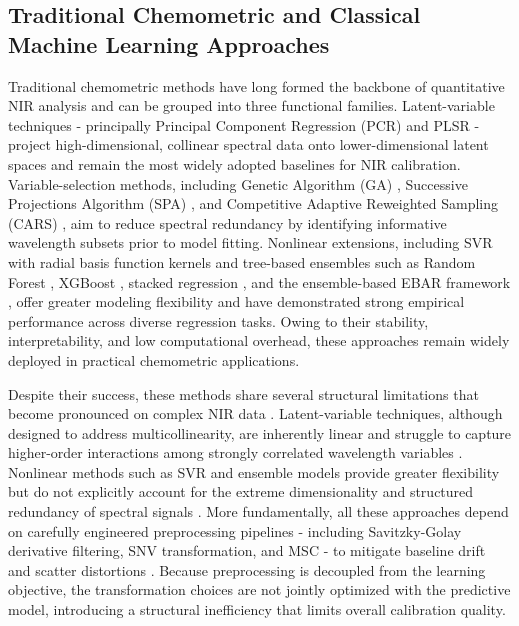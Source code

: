 \documentclass[pdflatex,sn-mathphys-num]{sn-jnl}%
\begin{document}
\subsection{Traditional Chemometric and Classical Machine 
Learning Approaches}

Traditional chemometric methods have long formed the backbone of quantitative NIR analysis and can be grouped into three functional families. Latent-variable techniques - principally Principal Component Regression (PCR) \cite{barati2025principal, wang2024comparison} and PLSR \cite{de2025quantification, zhu2024vis} - project high-dimensional, collinear spectral data onto lower-dimensional latent spaces and remain the most widely adopted baselines for NIR calibration. Variable-selection methods, including Genetic Algorithm (GA) \cite{ma2025wavelength}, Successive Projections Algorithm (SPA) \cite{dos2023improved}, and Competitive Adaptive Reweighted Sampling (CARS) \cite{li2023quantitative}, aim to reduce spectral redundancy by identifying informative wavelength subsets prior to model fitting. Nonlinear extensions, including SVR with radial basis function kernels \cite{sim2023support} and tree-based ensembles such as Random Forest \cite{peng2025near}, XGBoost \cite{zou2025fusion}, stacked regression \cite{dumancas2022stacked}, and the ensemble-based EBAR framework \cite{phan2025ebar}, offer greater modeling flexibility and have demonstrated strong empirical performance across diverse regression tasks. Owing to their stability, interpretability, and low computational overhead, these approaches remain widely deployed in practical chemometric applications.

Despite their success, these methods share several structural limitations that become pronounced on complex NIR data \cite{yan2025review, bec2025interpretability}. Latent-variable techniques, although designed to address multicollinearity, are inherently linear and struggle to capture higher-order interactions among strongly correlated wavelength variables \cite{balabin2007comparison}. Nonlinear methods such as SVR and ensemble models provide greater flexibility but do not explicitly account for the extreme dimensionality and structured redundancy of spectral signals \cite{hao2023application}. More fundamentally, all these approaches depend on carefully engineered preprocessing pipelines - including Savitzky-Golay derivative filtering, SNV transformation, and MSC - to mitigate baseline drift and scatter distortions \cite{yan2025review}. Because preprocessing is decoupled from the learning objective, the transformation choices are not jointly optimized with the predictive model, introducing a structural inefficiency that limits overall calibration quality.
\end{document}
